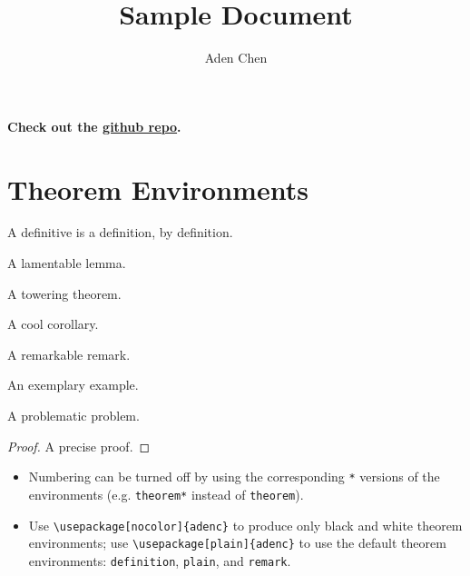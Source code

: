 \documentclass[10pt,letterpaper]{amsart}
\title{Sample Document}
\author{Aden Chen}
\begin{document}
\maketitle

\tableofcontents

\noindent
\textbf{Check out the \href{https://github.com/AdenChen27/latex}{github repo}. }

\section{Theorem Environments}

\begin{definition}
  A definitive  is a definition, by definition. 
\end{definition}

\begin{lemma}
  A lamentable lemma. 
\end{lemma}

\begin{theorem}
  A towering theorem. 
\end{theorem}

\begin{corollary}
  A cool corollary. 
\end{corollary}

\begin{remark}
  A remarkable remark. 
\end{remark}

\begin{example}
  An exemplary example. 
\end{example}

\begin{problem}
  A problematic problem. 
\end{problem}

\begin{proof}
  A precise proof.
\end{proof}

\begin{itemize}
  \item Numbering can be turned off by using the corresponding \verb|*| versions of the environments (e.g. \verb|theorem*| instead of \verb|theorem|). 
  \item Use \verb|\usepackage[nocolor]{adenc}| to produce only black and white theorem environments; use \verb|\usepackage[plain]{adenc}|  to use the default theorem environments: \texttt{definition}, \texttt{plain}, and \texttt{remark}.
\end{itemize}
\end{document}
